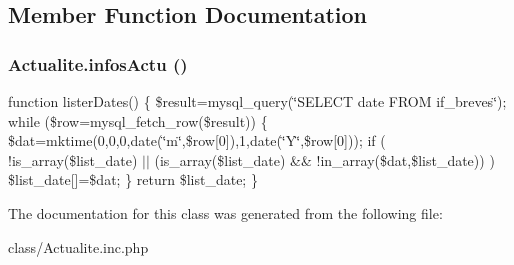 \subsection{Member Function Documentation}
\hypertarget{class_actualite_ac2b51cc4f1589ec1a238b130741928ba}{
\subsubsection[{infosActu}]{\setlength{\rightskip}{0pt plus 5cm}Actualite.infosActu ()}}
\label{class_actualite_ac2b51cc4f1589ec1a238b130741928ba}
function listerDates() \{ \$result=mysql\_\-query(\char`\"{}SELECT date FROM if\_\-breves\char`\"{}); while (\$row=mysql\_\-fetch\_\-row(\$result)) \{ \$dat=mktime(0,0,0,date(\char`\"{}m\char`\"{},\$row\mbox{[}0\mbox{]}),1,date(\char`\"{}Y\char`\"{},\$row\mbox{[}0\mbox{]})); if ( !is\_\-array(\$list\_\-date) $|$$|$ (is\_\-array(\$list\_\-date) \&\& !in\_\-array(\$dat,\$list\_\-date)) ) \$list\_\-date\mbox{[}\mbox{]}=\$dat; \} return \$list\_\-date; \} 

The documentation for this class was generated from the following file:\begin{DoxyCompactItemize}
\item 
class/Actualite.inc.php\end{DoxyCompactItemize}
